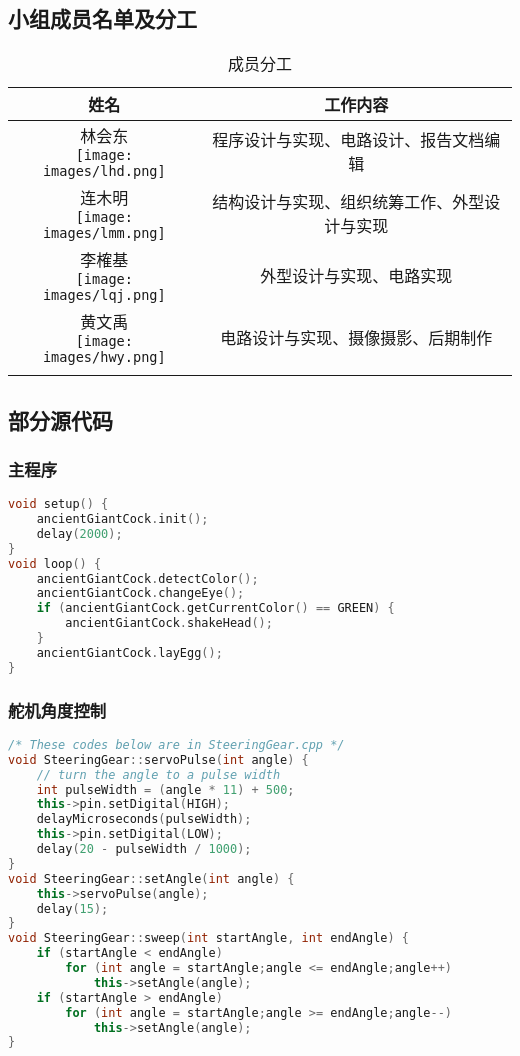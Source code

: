 \documentclass[a4paper,12pt]{ctexart}
\makeatletter
\newcommand{\tabincell}[2]{\begin{tabular}{@{}#1@{}}#2\end{tabular}}	%
\makeatother
\begin{document}
		\subsection{小组成员名单及分工}
			\begin{longtable}[!ht]{|c|c|}
				\hline
				\textbf{姓名} & \textbf{工作内容}\\ \hline
				\tabincell{c}{林会东\\\texttt{[image: images/lhd.png]}} & 程序设计与实现、电路设计、报告文档编辑\\ \hline
				\tabincell{c}{连木明\\\texttt{[image: images/lmm.png]}} & 结构设计与实现、组织统筹工作、外型设计与实现\\ \hline
				\tabincell{c}{李榷基\\\texttt{[image: images/lqj.png]}} & 外型设计与实现、电路实现\\ \hline
				\tabincell{c}{黄文禹\\\texttt{[image: images/hwy.png]}} & 电路设计与实现、摄像摄影、后期制作\\ \hline
			
			
			\caption{成员分工}\label{memberList}
			\end{longtable}
		\subsection{部分源代码}
			\subsubsection{主程序}
				\begin{lstlisting}[language=C++]
void setup() {
	ancientGiantCock.init();
	delay(2000);
}
void loop() {
	ancientGiantCock.detectColor();
	ancientGiantCock.changeEye();
	if (ancientGiantCock.getCurrentColor() == GREEN) {
		ancientGiantCock.shakeHead();
	}
	ancientGiantCock.layEgg();
}
				\end{lstlisting}
			\subsubsection{舵机角度控制}
				\begin{lstlisting}[language=C++]
/* These codes below are in SteeringGear.cpp */
void SteeringGear::servoPulse(int angle) {
	// turn the angle to a pulse width
	int pulseWidth = (angle * 11) + 500;
	this->pin.setDigital(HIGH);
	delayMicroseconds(pulseWidth);
	this->pin.setDigital(LOW);
	delay(20 - pulseWidth / 1000);
}
void SteeringGear::setAngle(int angle) {
	this->servoPulse(angle);
	delay(15);
}
void SteeringGear::sweep(int startAngle, int endAngle) {
	if (startAngle < endAngle)
		for (int angle = startAngle;angle <= endAngle;angle++)
			this->setAngle(angle);
	if (startAngle > endAngle)
		for (int angle = startAngle;angle >= endAngle;angle--)
			this->setAngle(angle);
}
				\end{lstlisting}
\end{document}
